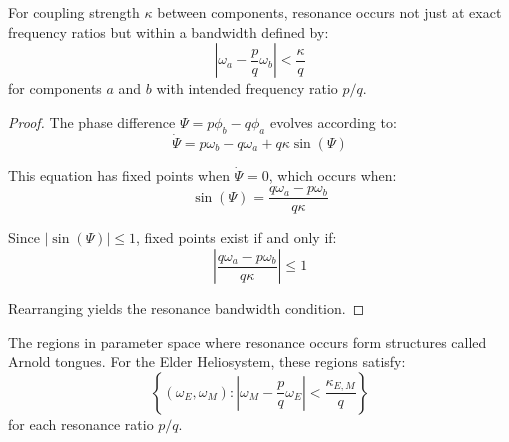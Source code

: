 \begin{theorem}
For coupling strength $\kappa$ between components, resonance occurs not just at exact frequency ratios but within a bandwidth defined by:
\begin{equation}
\left|\omega_a - \frac{p}{q}\omega_b\right| < \frac{\kappa}{q}
\end{equation}
for components $a$ and $b$ with intended frequency ratio $p/q$.
\end{theorem}

\begin{proof}
The phase difference $\Psi = p\phi_b - q\phi_a$ evolves according to:
\begin{equation}
\dot{\Psi} = p\omega_b - q\omega_a + q\kappa\sin(\Psi)
\end{equation}

This equation has fixed points when $\dot{\Psi} = 0$, which occurs when:
\begin{equation}
\sin(\Psi) = \frac{q\omega_a - p\omega_b}{q\kappa}
\end{equation}

Since $|\sin(\Psi)| \leq 1$, fixed points exist if and only if:
\begin{equation}
\left|\frac{q\omega_a - p\omega_b}{q\kappa}\right| \leq 1
\end{equation}

Rearranging yields the resonance bandwidth condition.
\end{proof}

\begin{definition}
The regions in parameter space where resonance occurs form structures called Arnold tongues. For the Elder Heliosystem, these regions satisfy:
\begin{equation}
\left\{(\omega_E, \omega_M) : \left|\omega_M - \frac{p}{q}\omega_E\right| < \frac{\kappa_{E,M}}{q} \right\}
\end{equation}
for each resonance ratio $p/q$.
\end{definition}

